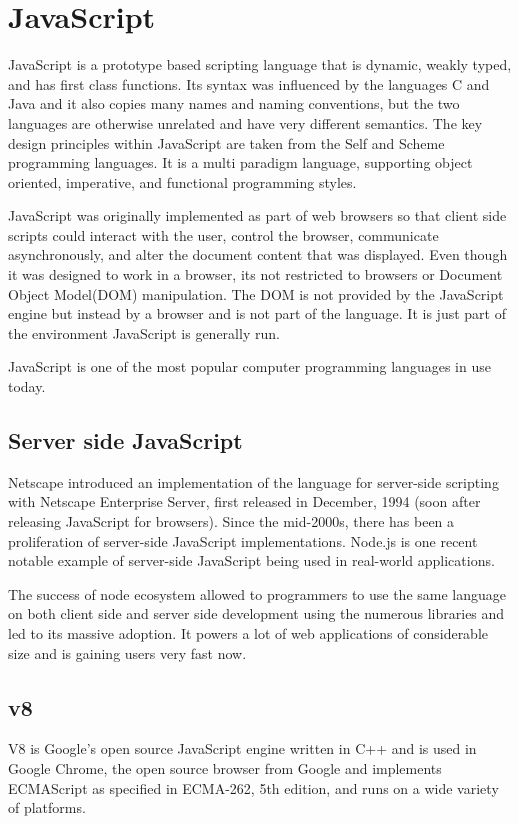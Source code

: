 \section{JavaScript}

JavaScript is a prototype based scripting language that is dynamic, weakly
typed, and has first class functions. Its syntax was influenced by the languages
C and Java and it also copies many names and naming conventions, but the two
languages are otherwise unrelated and have very different semantics. The key
design principles within JavaScript are taken from the Self and Scheme
programming languages. It is a multi paradigm language, supporting object
oriented, imperative, and functional programming styles.

JavaScript was originally implemented as part of web browsers so that client
side scripts could interact with the user, control the browser, communicate
asynchronously, and alter the document content that was displayed. Even though
it was designed to work in a browser, its not restricted to browsers or Document
Object Model(DOM) manipulation. The DOM is not provided by the JavaScript engine
but instead by a browser and is not part of the language. It is just part of the
environment JavaScript is generally run.

JavaScript is one of the most popular computer programming languages in use
today.

\subsection{Server side JavaScript}
Netscape introduced an implementation of the language for server-side scripting
with Netscape Enterprise Server, first released in December, 1994 (soon after
releasing JavaScript for browsers). Since the mid-2000s, there has been a
proliferation of server-side JavaScript implementations. Node.js is one recent
notable example of server-side JavaScript being used in real-world applications.

The success of node ecosystem allowed to programmers to use the same language on
both client side and server side development using the numerous libraries and
led to its massive adoption. It powers a lot of web applications of considerable
size and is gaining users very fast now.

\subsection{v8}
V8 is Google's open source JavaScript engine written in C++ and is used in
Google Chrome, the open source browser from Google and implements ECMAScript as
specified in ECMA-262, 5th edition, and runs on a wide variety of platforms.


